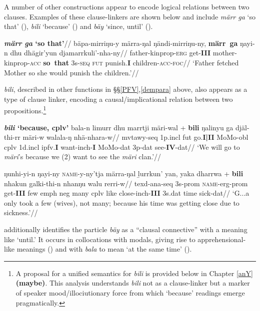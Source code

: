 A number of other constructions appear to encode logical relations between two clauses. Examples of these clause-linkers are shown below and include \textit{märr ga} `so that' (), \textit{bili} `because' () and \textit{bäy} `since, until' ().

\pex{}\begingl\glpreamble \textbf{\textit{märr ga} `so that'}//
 \gla bäpa-mirriŋu-y märra-ŋal ŋändi-mirriŋu-ny, \textbf{märr~ga} ŋayi-n dhu dhägir'yun djamarrkuli'-nha-ny//
\glb father-\gls{kinprop}-\textsc{erg} get-\textbf{III} mother-\gls{kinprop}-\textsc{acc} \textbf{so~that} 3s-\textsc{seq} \textsc{fut} punish.\textbf{I} children-\textsc{acc-foc}//
\glft`Father fetched Mother so she would punish the children.'//\endgl\xe


\textit{bili}, described in other functions in §§\ref{PFV},\ref{dempara} above, also appears as a type of clause linker, encoding a causal/implicational relation between two propositions.\footnote{A proposal for a unified semantics for \textit{bili} is provided below in Chapter \ref{anY} \textbf{(maybe)}. This analysis understands \textit{bili} not as a clause-linker but a marker of speaker mood/illociutionary force from which `because' readings emerge pragmatically.}

\pex{} \textbf{\textit{bili} `because, \gls{cplv}'}
\a\begingl\gla bala-n limurr dhu marrtji märi-wal + \textbf{bili} ŋalinyu ga djäl-thi-rr märi-w walala-ŋ nhä-nhara-w//
\glb \gls{mvtawy}-\gls{seq} 1p.\gls{incl} \gls{fut} go.\textbf{I|II} MoMo-\gls{obl} \gls{cplv} 1d.\gls{incl} \gls{ipfv}.\textbf{I} want-\gls{inch}-\textbf{I} MoMo-\gls{dat} 3p-\gls{dat} see-\textbf{IV}-\gls{dat}//
\glft`We will go to \textit{märi}'s because we (2) want to see the \textit{märi} clan.'//
\endgl

\a\begingl\gla ŋunhi-yi-n ŋayi-ny \textsc{name}-y-ny'tja märra-ŋal ḻurrkun' yan, yaka dharrwa + \textbf{bili} nhakun galki-thi-n nhanŋu walu rerri-w//
\glb \gls{texd}-\gls{ana}-\gls{seq} 3s-\gls{prom} \textsc{name}-\gls{erg}-\gls{prom} get-\textbf{III} few \gls{emph} \gls{neg} many \gls{cplv} like close-\gls{inch}-\textbf{III} 3s.\gls{dat} time sick-\gls{dat}//
\glft`G...a only took a few (wives), not many; because his time was getting close due to sickness.'//\endgl
\xe

\citet[670-1]{Wilkinson1991} additionally identifies the particle \textit{bäy} as a ``clausal connective'' with a meaning like `until.' It occurs in collocations with modals, giving rise to apprehensional-like meanings () and with \textit{bala} to mean `at the same time' ().

